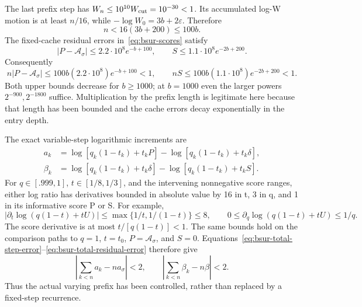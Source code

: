 The last prefix step has $W_n\le10^{10}W_{\rm cut}=10^{-30}<1$.
Its accumulated log-W motion is at least $n/16$, while
$-\log W_0=3b+2\varepsilon$. Therefore
\[
 n<16(3b+200)\le100b.
\]
The fixed-cache residual errors in~\eqref{eq:bsur-scores} satisfy
\[
 |P-\mathcal A_\sigma|\le2.2\cdot10^8e^{-b+100},\qquad
 S\le1.1\cdot10^8e^{-2b+200}.
\]
Consequently
\begin{equation}\label{eq:bsur-total-residual-error}
 n|P-\mathcal A_\sigma|
 \le100b(2.2\cdot10^8)e^{-b+100}<1,
 \qquad nS\le100b(1.1\cdot10^8)e^{-2b+200}<1.
\end{equation}
Both upper bounds decrease for $b\ge1000$; at $b=1000$ even the larger powers
$2^{-900},2^{-1800}$ suffice. Multiplication by the prefix length is legitimate
here because that length has been bounded and the cache errors decay
exponentially in the entry depth.

The exact variable-step logarithmic increments are
\[
 \begin{aligned}
 a_k&=\log[q_k(1-t_k)+t_kP]-\log[q_k(1-t_k)+t_k\delta],\\
 \beta_k&=\log[q_k(1-t_k)+t_k\delta]-\log[q_k(1-t_k)+t_kS].
 \end{aligned}
\]
For $q\in[.999,1]$, $t\in[1/8,1/3]$, and the intervening nonnegative score
ranges, either log ratio has derivatives bounded in absolute value by 16 in t,
3 in q, and 1 in its informative score P or S. For example,
\[
 \left|\partial_t\log(q(1-t)+tU)\right|
 \le\max\{1/t,1/(1-t)\}\le8,\qquad
 0\le\partial_q\log(q(1-t)+tU)\le1/q.
\]
The score derivative is at most $t/[q(1-t)]<1$.
The same bounds hold on the comparison paths to $q=1$, $t=t_0$,
$P=\mathcal A_\sigma$, and $S=0$.
Equations~\eqref{eq:bsur-total-step-error}--\eqref{eq:bsur-total-residual-error}
therefore give
\begin{equation}\label{eq:bsur-prefix-log-error}
 \left|\sum_{k<n}a_k-na_\sigma\right|<2,\qquad
 \left|\sum_{k<n}\beta_k-n\beta\right|<2.
\end{equation}
Thus the actual varying prefix has been controlled, rather than replaced by a
fixed-step recurrence.

